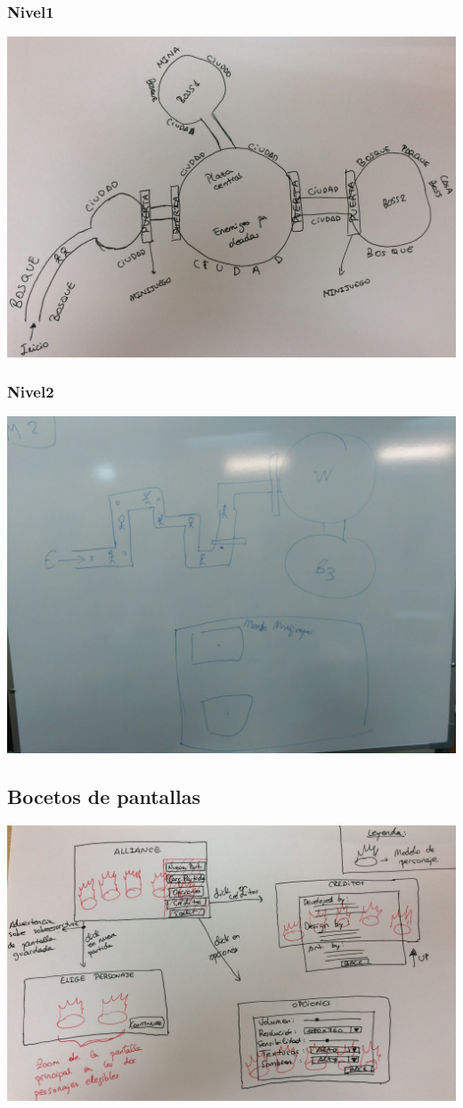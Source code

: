 \documentclass[11pt, twoside]{article}
\begin{document}
\subsubsection{Nivel1}
\includegraphics[width=16cm]{./images/mapa1.png}

\subsubsection{Nivel2}
\includegraphics[width=16cm]{./images/Level2.jpg}

\subsection{Bocetos de pantallas}
\includegraphics[width=16cm]{./images/pantallas.png}
\end{document}

